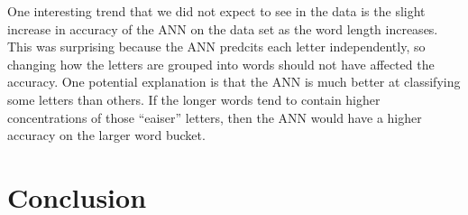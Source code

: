 \documentclass[11pt,a4paper,twocolumn]{article}
\begin{document}
One interesting trend that we did not expect to see in the data is the slight increase in accuracy of the ANN on the data set as the word length increases. This was surprising because the ANN predcits each letter independently, so changing how the letters are grouped into words should not have affected the accuracy. One potential explanation is that the ANN is much better at classifying some letters than others. If the longer words tend to contain higher concentrations of those ``eaiser'' letters, then the ANN would have a higher accuracy on the larger word bucket. 



\section{Conclusion}



\end{document}
